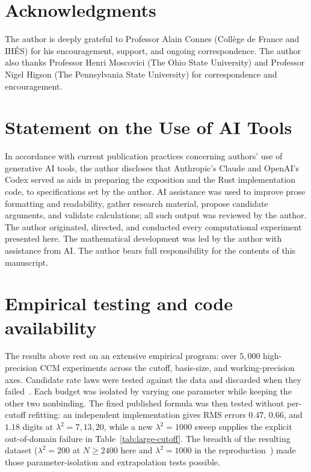 \documentclass[11pt,a4paper]{article}
\begin{document}
\section*{Acknowledgments}
The author is deeply grateful to Professor Alain Connes (Coll\`ege de France
and IH\'ES) for his encouragement, support, and ongoing correspondence. The
author also thanks Professor Henri Moscovici (The Ohio State University) and
Professor Nigel Higson (The Pennsylvania State University) for correspondence
and encouragement.

\section*{Statement on the Use of AI Tools}

In accordance with current publication practices concerning authors'
use of generative AI tools, the author discloses that Anthropic's
Claude and OpenAI's Codex served as aids in preparing the exposition
and the Rust implementation code, to specifications set by the author.
AI assistance was used to improve prose formatting and readability,
gather research material, propose candidate arguments, and validate
calculations; all such output was reviewed by the author. The author
originated, directed, and conducted every computational experiment
presented here. The mathematical development was led by the author
with assistance from AI. The author bears full responsibility for the
contents of this manuscript.

\section*{Empirical testing and code availability}
The results above rest on an extensive empirical program: over $5{,}000$
high-precision CCM experiments across the cutoff, basis-size, and
working-precision axes. Candidate rate laws were tested against the data and
discarded when they failed~\cite{AndrewsB}. Each budget was isolated by varying
one parameter while keeping the other two nonbinding. The fixed published
formula was then tested without per-cutoff refitting: an independent
implementation gives RMS errors $0.47$, $0.66$, and $1.18$ digits at
$\lambda^2=7,13,20$, while a new $\lambda^2=1000$ sweep supplies the explicit
out-of-domain failure in Table~\ref{tab:large-cutoff}. The breadth of the
resulting dataset ($\lambda^2=200$ at $N\ge2400$ here and $
\lambda^2=1000$ in the reproduction~\cite{AndrewsA}) made those
parameter-isolation and extrapolation tests possible.
\end{document}
